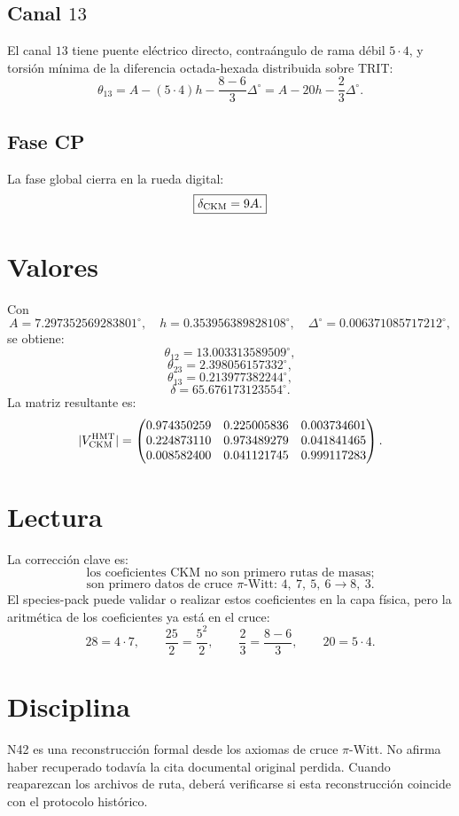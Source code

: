\documentclass[11pt,a4paper]{article}
\begin{document}
\subsection*{Canal \(13\)}
El canal \(13\) tiene puente eléctrico directo, contraángulo de rama débil \(5\cdot4\), y torsión mínima de la diferencia octada-hexada distribuida sobre TRIT:
\[
\boxed{
\theta_{13}=A-(5\cdot4)h-\frac{8-6}{3}\Delta^\circ
=
A-20h-\frac23\Delta^\circ.
}
\]

\subsection*{Fase CP}
La fase global cierra en la rueda digital:
\[
\boxed{
\delta_{\rm CKM}=9A.
}
\]

\section{Valores}

Con
\[
A=7.297352569283801^\circ,\quad h=0.353956389828108^\circ,\quad
\Delta^\circ=0.006371085717212^\circ,
\]
se obtiene:
\[
\theta_{12}=13.003313589509^\circ,
\]
\[
\theta_{23}=2.398056157332^\circ,
\]
\[
\theta_{13}=0.213977382244^\circ,
\]
\[
\delta=65.676173123554^\circ.
\]
La matriz resultante es:
\[
|V_{\rm CKM}^{\rm HMT}|=
\begin{pmatrix}
0.974350259 & 0.225005836 & 0.003734601\\
0.224873110 & 0.973489279 & 0.041841465\\
0.008582400 & 0.041121745 & 0.999117283
\end{pmatrix}.
\]

\section{Lectura}

La corrección clave es:
\[
\boxed{
\text{los coeficientes CKM no son primero rutas de masas;}
}
\]
\[
\boxed{
\text{son primero datos de cruce }\pi\text{-Witt: }4,\ 7,\ 5,\ 6\to8,\ 3.
}
\]
El species-pack puede validar o realizar estos coeficientes en la capa física, pero la aritmética de los coeficientes ya está en el cruce:
\[
28=4\cdot7,\qquad
\frac{25}{2}=\frac{5^2}{2},\qquad
\frac23=\frac{8-6}{3},\qquad
20=5\cdot4.
\]

\section{Disciplina}

N42 es una reconstrucción formal desde los axiomas de cruce \(\pi\)-Witt. No afirma haber recuperado todavía la cita documental original perdida. Cuando reaparezcan los archivos de ruta, deberá verificarse si esta reconstrucción coincide con el protocolo histórico.
\end{document}
